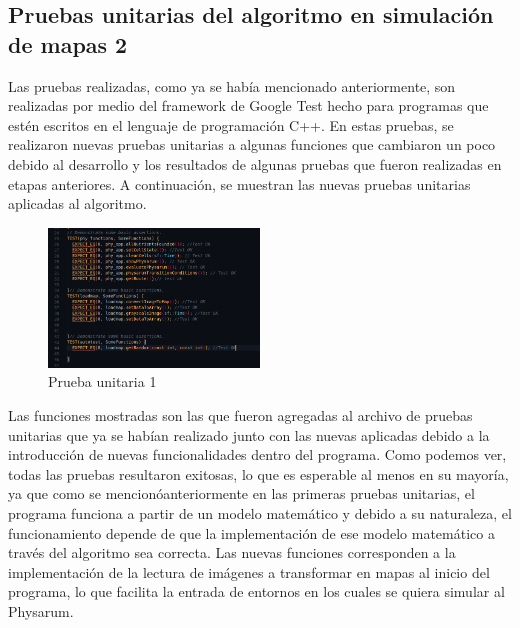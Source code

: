 \subsection{Pruebas unitarias del algoritmo en simulaci\'on de mapas 2}
    Las pruebas realizadas, como ya se hab\'ia mencionado
        anteriormente, son realizadas por medio del framework de
        Google Test hecho para programas que est\'en escritos en el
        lenguaje de programaci\'on C++.
        \vskip 0.5cm
    En estas pruebas, se realizaron nuevas pruebas unitarias a
        algunas funciones que cambiaron un poco debido al
        desarrollo y los resultados de algunas pruebas que fueron
        realizadas en etapas anteriores. A continuaci\'on, se muestran
        las nuevas pruebas unitarias aplicadas al algoritmo.
        \vskip 0.5cm
    \begin{figure}[htbp]
        \centering
        \includegraphics[width=0.5\textwidth]{./images/Pruebas/simulador/image041.png}
        \caption{Prueba unitaria 1}
        \label{fig:Prueba unitaria 1}
    \end{figure}
    Las funciones mostradas son las que fueron agregadas al
        archivo de pruebas unitarias que ya se hab\'ian realizado junto
        con las nuevas aplicadas debido a la introducci\'on de nuevas
        funcionalidades dentro del programa. Como podemos ver,
        todas las pruebas resultaron exitosas, lo que es esperable al
        menos en su mayor\'ia, ya que como se mencion\'oanteriormente en las primeras pruebas unitarias, el programa
        funciona a partir de un modelo matem\'atico y debido a su
        naturaleza, el funcionamiento depende de que la
        implementaci\'on de ese modelo matem\'atico a trav\'es del
        algoritmo sea correcta.
        \vskip 0.5cm
    Las nuevas funciones corresponden a la implementaci\'on de
        la lectura de im\'agenes a transformar en mapas al inicio del
        programa, lo que facilita la entrada de entornos en los cuales
        se quiera simular al Physarum.
        \vskip 0.5cm
